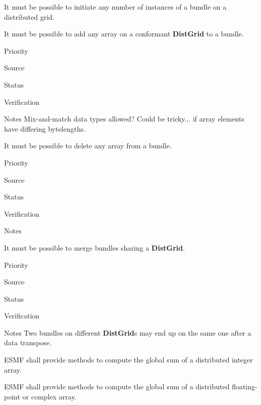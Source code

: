 
It must be possible to initiate any number of instances of a bundle on
a distributed grid.


It must be possible to add any array on a conformant \textbf{DistGrid}
to a bundle.

\begin{reqlist}
\item[Priority]
\item[Source]
\item[Status]
\item[Verification]
\item[Notes] Mix-and-match data types allowed? Could be tricky... if
  array elements have differing bytelengths.
\end{reqlist}


It must be possible to delete any array from a bundle.

\begin{reqlist}
\item[Priority]
\item[Source]
\item[Status]
\item[Verification]
\item[Notes]
\end{reqlist}


It must be possible to merge bundles sharing a \textbf{DistGrid}.

\begin{reqlist}
\item[Priority]
\item[Source]
\item[Status]
\item[Verification]
\item[Notes] Two bundles on different \textbf{DistGrid}s may end up on the same
  one after a data transpose.
\end{reqlist}



ESMF shall provide methods to compute the global sum of a distributed
integer array.


ESMF shall provide methods to compute the global sum of a distributed
floating-point or complex array.

